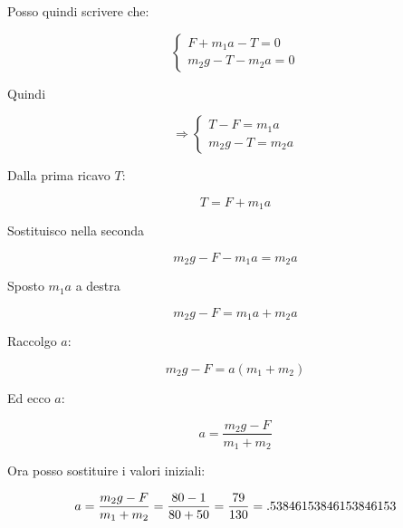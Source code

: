Posso quindi scrivere che:
\setcounter{equation}{0}

\begin{equation}
\left\{
\begin{array}{ll}
F + m_1a -T = 0\\
m_2g -T - m_2a =0
\end{array}
\right.
\end{equation}

Quindi

\begin{equation}
\Rightarrow
\left\{
\begin{array}{ll}
T - F = m_1a\\
m_2g -T = m_2a
\end{array}
\right.
\end{equation}

Dalla prima ricavo $T$:


\begin{equation}
T = F + m_1a
\end{equation}

Sostituisco nella seconda

\begin{equation}
m_2g -F - m_1a = m_2a
\end{equation}

Sposto $m_1a$ a destra

\begin{equation}
m_2g -F = m_1a + m_2a
\end{equation}

Raccolgo $a$:

\begin{equation}
m_2g -F = a(m_1 + m_2)
\end{equation}

Ed ecco $a$:

\begin{equation}
a=\frac{
m_2g -F
}{
m_1 + m_2
}
\end{equation}

Ora posso sostituire i valori iniziali:

\begin{equation}
a=\frac{ m_2g -F }{ m_1 + m_2 } =  \\
\frac{80-1}{80+50} = \\
\frac{79}{130} = \\
.53846153846153846153
\end{equation}


